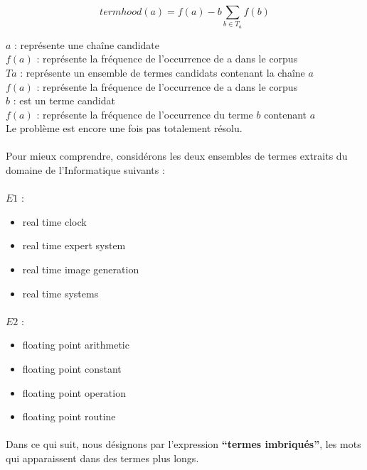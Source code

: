 \documentclass[12pt, a4paper, oneside]{book}
\begin{document}
\begin{equation}
termhood(a) = f(a) - b  \sum_{b \in T_a} f(b)
\end{equation}

$a$ : représente une chaîne candidate\\
$f(a)$ : représente la fréquence de l'occurrence de a dans le corpus\\
$Ta$ : représente un ensemble de termes candidats contenant la chaîne $a$\\
$f(a)$ : représente la fréquence de l'occurrence de a dans le corpus\\
$b$ : est un terme candidat\\
$f(a)$ : représente la fréquence de l'occurrence du terme $b$ contenant $a$\\ 
Le problème est encore une fois pas totalement résolu. 
\paragraph{}
Pour mieux comprendre, considérons les deux ensembles de termes extraits du domaine de l'Informatique suivants : 
\paragraph{}
$E1$ :
\begin{itemize}

\item real time clock
\item real time expert system
\item real time image generation
\item real time systems

\end{itemize}

\paragraph{}
$E2$ : 
\begin{itemize}

\item floating point arithmetic
\item floating point constant
\item floating point operation
\item floating point routine

\end{itemize}

\paragraph{}
Dans ce qui suit, nous désignons par l'expression \textbf{“termes imbriqués”}, les mots qui apparaissent dans des termes plus longs.
\end{document}
